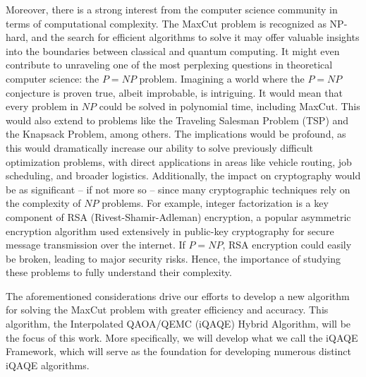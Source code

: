 Moreover, there is a strong interest from the computer science community in terms of computational complexity. The MaxCut problem is recognized as NP-hard, and the search for efficient algorithms to solve it may offer valuable insights into the boundaries between classical and quantum computing. It might even contribute to unraveling one of the most perplexing questions in theoretical computer science: the $P = NP$ problem. Imagining a world where the $P = NP$ conjecture is proven true, albeit improbable, is intriguing. It would mean that every problem in $NP$ could be solved in polynomial time, including MaxCut. This would also extend to problems like the Traveling Salesman Problem (TSP) and the Knapsack Problem, among others. The implications would be profound, as this would dramatically increase our ability to solve previously difficult optimization problems, with direct applications in areas like vehicle routing, job scheduling, and broader logistics. Additionally, the impact on cryptography would be as significant – if not more so – since many cryptographic techniques rely on the complexity of $NP$ problems. For example, integer factorization is a key component of RSA (Rivest-Shamir-Adleman) encryption, a popular asymmetric encryption algorithm used extensively in public-key cryptography for secure message transmission over the internet. If $P = NP$, RSA encryption could easily be broken, leading to major security risks. Hence, the importance of studying these problems to fully understand their complexity.

The aforementioned considerations drive our efforts to develop a new algorithm for solving the MaxCut problem with greater efficiency and accuracy. This algorithm, the Interpolated QAOA/QEMC (iQAQE) Hybrid Algorithm, will be the focus of this work. More specifically, we will develop what we call the iQAQE Framework, which will serve as the foundation for developing numerous distinct iQAQE algorithms.

